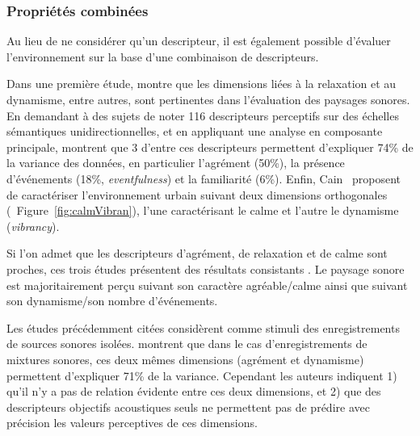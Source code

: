 \subsubsection{Propriétés combinées}

Au lieu de ne considérer qu'un descripteur, il est également possible d'évaluer l'environnement sur la base d'une combinaison de descripteurs.

Dans une première étude, \citep{kang2006urban} montre que les dimensions liées à la relaxation et au dynamisme, entre autres, sont pertinentes dans l'évaluation des paysages sonores. En demandant à des sujets de noter 116 descripteurs perceptifs sur des échelles sémantiques unidirectionnelles, et en appliquant une analyse en composante principale, \citep{axelsson2010principal} montrent que 3 d'entre ces descripteurs permettent d'expliquer 74\% de la variance des données, en particulier l'agrément (50\%), la présence d'événements (18\%, \emph{eventfulness})  et la familiarité (6\%). Enfin,  Cain~\al \citep{cain2013development} proposent de caractériser l'environnement urbain suivant deux dimensions orthogonales (\cf~Figure~\ref{fig:calmVibran}), l'une caractérisant le calme et l'autre le dynamisme (\emph{vibrancy}).

Si l'on admet que les descripteurs d'agrément, de relaxation et de calme sont proches, ces trois études présentent des résultats consistants \citep{davies2013perception}. Le paysage sonore est majoritairement perçu suivant son caractère agréable/calme ainsi que suivant son dynamisme/son nombre d'événements.
 
Les études précédemment citées considèrent comme stimuli des enregistrements de sources sonores isolées. \citep{hall2013exploratory} montrent que dans le cas d'enregistrements de mixtures sonores, ces deux mêmes dimensions (agrément et dynamisme) permettent d'expliquer 71\% de la variance. Cependant les auteurs indiquent 1) qu'il n'y a pas de relation évidente entre ces deux dimensions, et 2) que des descripteurs objectifs acoustiques seuls ne permettent pas de prédire avec précision les valeurs perceptives de ces dimensions.
 
